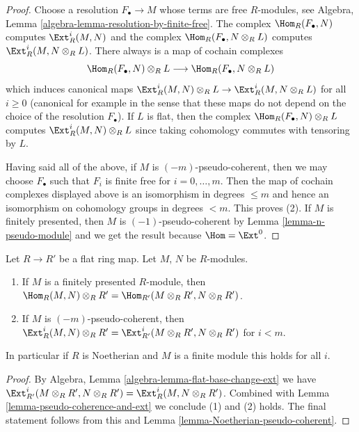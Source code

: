 \begin{proof}
Choose a resolution $F_\bullet \to M$ whose terms are free $R$-modules, see
Algebra, Lemma \ref{algebra-lemma-resolution-by-finite-free}. The complex
$\Hom_R(F_\bullet, N)$ computes $\Ext^i_R(M, N)$ and the complex
$\Hom_R(F_\bullet, N \otimes_R L)$ computes $\Ext^i_R(M, N \otimes_R L)$.
There always is a map of cochain complexes
$$
\Hom_R(F_\bullet, N) \otimes_R L
\longrightarrow
\Hom_R(F_\bullet, N \otimes_R L)
$$
which induces canonical maps
$\Ext^i_R(M, N) \otimes_R L \to \Ext^i_R(M, N \otimes_R L)$
for all $i \geq 0$ (canonical for example in the sense that these maps
do not depend on the choice of the resolution $F_\bullet$).
If $L$ is flat, then the complex $\Hom_R(F_\bullet, N) \otimes_R L$
computes $\Ext^i_R(M, N) \otimes_R L$ since taking cohomology commutes
with tensoring by $L$.

\medskip\noindent
Having said all of the above, if $M$ is $(-m)$-pseudo-coherent, then we
may choose $F_\bullet$ such that $F_i$ is finite free for $i = 0, \ldots, m$.
Then the map of cochain complexes displayed above is an isomorphism in degrees
$\leq m$ and hence an isomorphism on cohomology groups in degrees
$< m$. This proves (2). If $M$ is finitely presented, then $M$ is
$(-1)$-pseudo-coherent by Lemma \ref{lemma-n-pseudo-module}
and we get the result because $\Hom = \Ext^0$.
\end{proof}

\begin{lemma}
\label{lemma-pseudo-coherence-and-base-change-ext}
Let $R \to R'$ be a flat ring map. Let $M$, $N$ be $R$-modules.
\begin{enumerate}
\item If $M$ is a finitely presented $R$-module, then
$\Hom_R(M, N) \otimes_R R' = \Hom_{R'}(M \otimes_R R', N \otimes_R R')$.
\item If $M$ is $(-m)$-pseudo-coherent, then
$\Ext^i_R(M, N) \otimes_R R' = \Ext^i_{R'}(M \otimes_R R', N \otimes_R R')$
for $i < m$.
\end{enumerate}
In particular if $R$ is Noetherian and $M$ is a finite module this
holds for all $i$.
\end{lemma}

\begin{proof}
By Algebra, Lemma \ref{algebra-lemma-flat-base-change-ext} we have
$\Ext^i_{R'}(M \otimes_R R', N \otimes_R R') =
\Ext^i_R(M, N \otimes_R R')$.
Combined with Lemma \ref{lemma-pseudo-coherence-and-ext}
we conclude (1) and (2) holds. The final statement follows from this
and Lemma \ref{lemma-Noetherian-pseudo-coherent}.
\end{proof}

